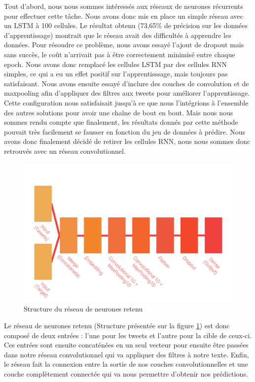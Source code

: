 \par Tout d'abord, nous nous sommes intéressés aux réseaux de neurones récurrents pour effectuer cette tâche. Nous avons donc mis en place un simple réseau avec un LSTM à 100 cellules. Le résultat obtenu (73,65\% de précision sur les données d'apprentissage) montrait que le réseau avait des difficultés à apprendre les données. Pour résoudre ce problème, nous avons essayé l'ajout de dropout mais sans succès, le coût n'arrivait pas à être correctement minimisé entre chaque epoch. Nous avons donc remplacé les cellules LSTM par des cellules RNN simples, ce qui a eu un effet positif sur l'apprentisssage, mais toujours pas satisfaisant. Nous avons ensuite essayé d'inclure des couches de convolution et de maxpooling afin d'appliquer des filtres aux tweets pour améliorer l'apprentissage. Cette configuration nous satisfaisait jusqu'à ce que nous l'intégrions à l'ensemble des autres solutions pour avoir une chaîne de bout en bout. Mais nous nous sommes rendu compte que finalement, les résultats donnés par cette méthode pouvait très facilement se fausser en fonction du jeu de données à prédire. Nous avons donc finalement décidé de retirer les cellules RNN, nous nous sommes donc retrouvés avec un réseau convolutionnel.

\begin{figure}
	\centering
	\includegraphics[scale=1.5]{./img/nn.png}
	\caption{Structure du réseau de neurones retenu}
	\label{fig:nn}
\end{figure}

\par Le réseau de neurones retenu (Structure présentée sur la figure \ref{fig:nn}) est donc composé de deux entrées : l'une pour les tweets et l'autre pour la cible de ceux-ci. Ces entrées sont ensuite concaténées en un seul vecteur pour ensuite être passées dans notre réseau convolutionnel qui va appliquer des filtres à notre texte. Enfin, le réseau fait la connexion entre la sortie de nos couches convolutionnelles et une couche complètement connectée qui va nous permettre d'obtenir nos prédictions.


